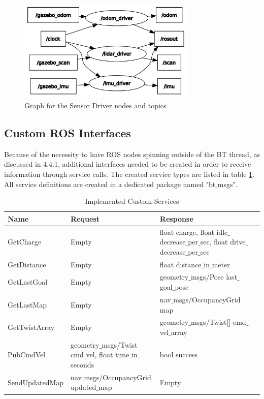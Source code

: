 \begin{center}
\begin{figure}[ht]
	\includegraphics[width=0.75\textwidth]{images/rqt_graph_sensor_drivers.png}
	\caption{Graph for the Sensor Driver nodes and topics}
	\label{fig:rqt_graph}
\end{figure}
\end{center}

\subsection{Custom ROS Interfaces}

Because of the necessity to have ROS nodes spinning outside of the BT thread, as discussed in 4.4.1, additional interfaces needed to be created in order to receive information through service calls. The created service types are listed in table \ref{tab:custom_interfaces}. All service definitions are created in a dedicated package named "bt$\_$msgs". 

\begin{table}[ht]
	\caption{Implemented Custom Services}
	\label{tab:custom_interfaces}
	\begin{tabular}{ | m{} | m{}| m{} | m{} |} 
  	\hline
  	\textbf{Name} & \textbf{Request} & \textbf{Response} \\ 
  	\hline
  	GetCharge & Empty & float charge, float idle$\_$decrease$\_$per$\_$sec, float drive$\_$decrease$\_$per$\_$sec \\
  	\hline
  	GetDistance & Empty & float distance$\_$in$\_$meter\\ 
  	\hline
  	GetLastGoal & Empty & geometry$\_$msgs/Pose last$\_$goal$\_$pose \\ 
  	\hline
  	GetLastMap & Empty & nav$\_$msgs/OccupancyGrid map \\
  	\hline
  	GetTwistArray & Empty & geometry$\_$msgs/Twist[] cmd$\_$vel$\_$array\\
  	\hline  	
  	PubCmdVel & geometry$\_$msgs/Twist cmd$\_$vel, float time$\_$in$\_$seconds & bool success \\
  	\hline
  	SendUpdatedMap & nav$\_$msgs/OccupancyGrid updated$\_$map & Empty \\
  	\hline
	\end{tabular}
\end{table}
